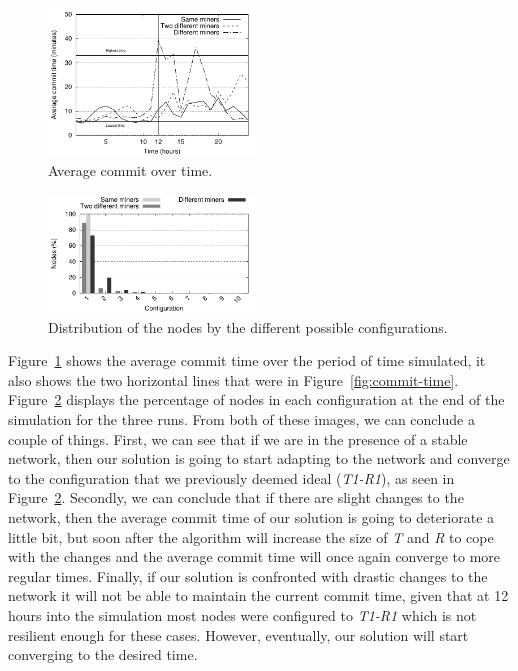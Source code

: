 \documentclass{dads}   %
\begin{document}
\begin{figure}[h]
\centering
\includegraphics[width=0.5\textwidth]{plots/commit_over_time.pdf}
\caption{Average commit over time.}
\label{fig:commit-over-time}
\end{figure}
\vspace{-3.5mm}

\begin{figure}[h]
\centering
\includegraphics[width=0.5\textwidth]{plots/nodes_per_config.pdf}
\caption{Distribution of the nodes by the different possible configurations.}
\label{fig:node-per-conf}
\end{figure}
\vspace{-2.5mm}

Figure~\ref{fig:commit-over-time} shows the average commit time over the period of time simulated, it also shows the two horizontal lines that were in Figure~\ref{fig:commit-time}. Figure~\ref{fig:node-per-conf} displays the percentage of nodes in each configuration at the end of the simulation for the three runs. From both of these images, we can conclude a couple of things. First, we can see that if we are in the presence of a stable network, then our solution is going to start adapting to the network and converge to the configuration that we previously deemed ideal (\textsl{T1-R1}), as seen in Figure~\ref{fig:node-per-conf}. Secondly, we can conclude that if there are slight changes to the network, then the average commit time of our solution is going to deteriorate a little bit, but soon after the algorithm will increase the size of \textsl{T} and \textsl{R} to cope with the changes and the average commit time will once again converge to more regular times. Finally, if our solution is confronted with drastic changes to the network it will not be able to maintain the current commit time, given that at 12 hours into the simulation most nodes were configured to \textsl{T1-R1} which is not resilient enough for these cases. However, eventually, our solution will start converging to the desired time. 
\vspace{-3.5mm}
\end{document}
